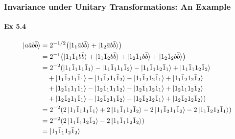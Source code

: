 \documentclass[a4paper]{article}
\newcommand{\ex}[1]{\paragraph{Ex #1}}
\numberwithin{equation}{subsection}
\begin{document}
\subsubsection{Invariance under Unitary Transformations: An Example}
\ex{5.4}
\begin{align}
\ket{a\bar{a} b\bar{b}} &= 2^{-1/2} \qty(\ket{1_1\bar{a} b\bar{b}} + \ket{1_2\bar{a} b\bar{b}}) \notag\\
&= 2^{-1} \qty(\ket{1_1\bar{1}_1 b\bar{b}} + \ket{1_1\bar{1}_2 b\bar{b}}  + \ket{1_2\bar{1}_1 b\bar{b}} + \ket{1_2\bar{1}_2 b\bar{b}}) \notag\\
&= 2^{-2} (
\ket{1_1\bar{1}_1 1_1\bar{1}_1} - \ket{1_1\bar{1}_1 1_1\bar{1}_2} - \ket{1_1\bar{1}_1 1_2\bar{1}_1} + \ket{1_1\bar{1}_1 1_2\bar{1}_2} \notag\\
&{}\quad + \ket{1_1\bar{1}_2 1_1\bar{1}_1} - \ket{1_1\bar{1}_2 1_1\bar{1}_2} - \ket{1_1\bar{1}_2 1_2\bar{1}_1} + \ket{1_1\bar{1}_2 1_2\bar{1}_2} \notag\\
&{}\quad + \ket{1_2\bar{1}_1 1_1\bar{1}_1} - \ket{1_2\bar{1}_1 1_1\bar{1}_2} - \ket{1_2\bar{1}_1 1_2\bar{1}_1} + \ket{1_2\bar{1}_1 1_2\bar{1}_2} \notag\\
&{}\quad + \ket{1_2\bar{1}_2 1_1\bar{1}_1} - \ket{1_2\bar{1}_2 1_1\bar{1}_2} - \ket{1_2\bar{1}_2 1_2\bar{1}_1} + \ket{1_2\bar{1}_2 1_2\bar{1}_2}
) \notag\\
&= 2^{-2} (
2\ket{1_1\bar{1}_1 1_1\bar{1}_1}   + 2\ket{1_1\bar{1}_1 1_2\bar{1}_2} 
- 2\ket{1_1\bar{1}_2 1_1\bar{1}_2} - 2\ket{1_1\bar{1}_2 1_2\bar{1}_1}  
) \notag\\
&= 2^{-2} ( 2\ket{1_1\bar{1}_1 1_2\bar{1}_2} - 2\ket{1_1 \bar{1}_1 1_2\bar{1}_2}  ) \notag\\
&= \ket{1_1\bar{1}_1 1_2\bar{1}_2}
\end{align}
\end{document}

